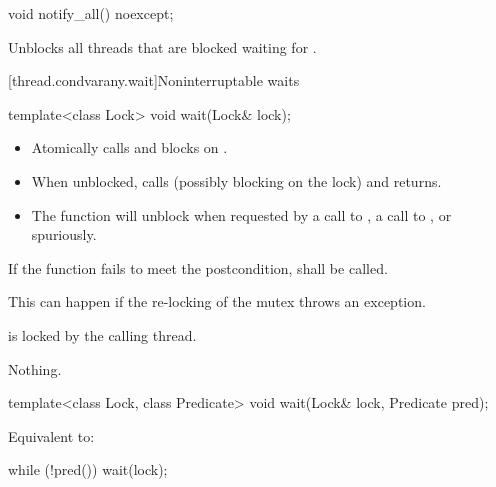 %
\begin{itemdecl}
void notify_all() noexcept;
\end{itemdecl}

\begin{itemdescr}
\pnum\effects Unblocks all threads that are blocked waiting for .
\end{itemdescr}



{\color{insertcolor}
[thread.condvarany.wait]{Noninterruptable waits}
}

%
\begin{itemdecl}
template<class Lock>
  void wait(Lock& lock);
\end{itemdecl}

\begin{itemdescr}
\pnum
\effects
\begin{itemize}
\item Atomically calls  and blocks on .
\item When unblocked, calls  (possibly blocking on the lock) and returns.
\item The function will unblock when requested by a call to ,
a call to , or spuriously.
\end{itemize}

\pnum
\remarks
If the function fails to meet the postcondition, 
shall be called.
\begin{note} This can happen if the re-locking of the mutex throws an exception. \end{note}

\pnum\postconditions {} is locked by the calling thread.

\pnum\throws Nothing.

\end{itemdescr}


%
\begin{itemdecl}
template<class Lock, class Predicate>
  void wait(Lock& lock, Predicate pred);
\end{itemdecl}

\begin{itemdescr}
\pnum
\effects Equivalent to:
\begin{codeblock}
while (!pred())
  wait(lock);
\end{codeblock}
\end{itemdescr}


